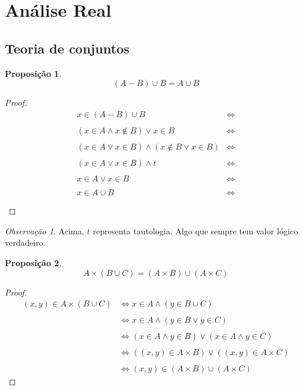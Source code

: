\documentclass{article}
\theoremstyle{plain}
\newtheorem{prop}{Proposição}[section]
\theoremstyle{definition}
\theoremstyle{remark}
\newtheorem{obs}{Observação}[section]
\begin{document}
\section{Análise Real}
\subsection{Teoria de conjuntos}
\begin{prop}
	$$(A-B)\cup B =  A\cup B$$
\end{prop}
\begin{proof}
	\begin{align*}
		x\in (A-B)\cup B &\iff \\~\\
		(x\in A \land x \not \in B) \lor x\in B &\iff \\~\\
		(x\in A\lor x\in B)  \land( x \not \in B \lor x\in B) &\iff \\~\\
		(x\in A\lor x\in B)  \land t &\iff \\~\\
		x\in A\lor x\in B &\iff \\~\\
		x \in A \cup B  &\iff \\~\\
	\end{align*}
\end{proof}
\begin{obs}
	Acima, $t$ representa tautologia.  Algo que sempre tem valor lógico verdadeiro.
\end{obs}
\begin{prop}
	$$A\times (B\cup C ) = (A\times B )\cup( A\times C)$$
\end{prop}
\begin{proof}
	\begin{align*}
		(x,y) \in A\times (B\cup C ) & \iff 
		x\in A \land (y\in B\cup C)  \\~\\ &\iff 
		x\in A \land (y\in B\lor y\in  C)  \\~\\& \iff
		(x\in A \land y\in B) \lor (x\in A \land y\in  C)  \\~\\& \iff
		((x,y)\in A\times B) \lor  ((x,y)\in  A\times C) \\~\\ & \iff
		(x,y)\in (A\times B) \cup  (A\times C)
	\end{align*}
\end{proof}
\end{document}
